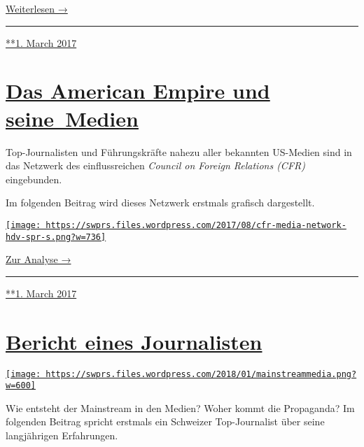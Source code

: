 \href{https://swprs.org/anschlag-auf-die-forschungsfreiheit\#weiterlesen}{Weiterlesen
→}

\begin{center}\rule{0.5\linewidth}{\linethickness}\end{center}

\href{https://swprs.org/2017/03/01/anschlag-auf-die-forschungsfreiheit/}{**1.
March 2017}

\hypertarget{das-american-empire-und-seine-medien}{%
\section{\texorpdfstring{\href{https://swprs.org/2017/03/01/netzwerk-medien-usa/}{Das
American Empire und
seine~Medien}}{Das American Empire und seine~Medien}}\label{das-american-empire-und-seine-medien}}

Top-Journalisten und Führungskräfte nahezu aller bekannten US-Medien
sind in das Netz­werk des einflussreichen \emph{Council on Foreign
Relations (CFR)} eingebunden.

Im folgenden Beitrag wird dieses Netzwerk erstmals grafisch
dar­ge­stellt.

\href{https://swprs.org/das-american-empire-und-seine-medien/}{\texttt{[image: https://swprs.files.wordpress.com/2017/08/cfr-media-network-hdv-spr-s.png?w=736]}}

\href{https://swprs.org/das-american-empire-und-seine-medien/}{Zur
Analyse →}

\begin{center}\rule{0.5\linewidth}{\linethickness}\end{center}

\href{https://swprs.org/2017/03/01/netzwerk-medien-usa/}{**1. March
2017}

\hypertarget{bericht-eines-journalisten}{%
\section{\texorpdfstring{\href{https://swprs.org/2017/03/01/bericht-eines-journalisten/}{Bericht
eines
Journalisten}}{Bericht eines Journalisten}}\label{bericht-eines-journalisten}}

\href{https://swprs.org/2017/03/01/bericht-eines-journalisten/}{\texttt{[image: https://swprs.files.wordpress.com/2018/01/mainstreammedia.png?w=600]}}

Wie entsteht der Mainstream in den Medien? Woher kommt die Propaganda?
Im folgenden Beitrag spricht erstmals ein Schweizer Top-Journalist über
seine langjährigen Erfahrungen.

